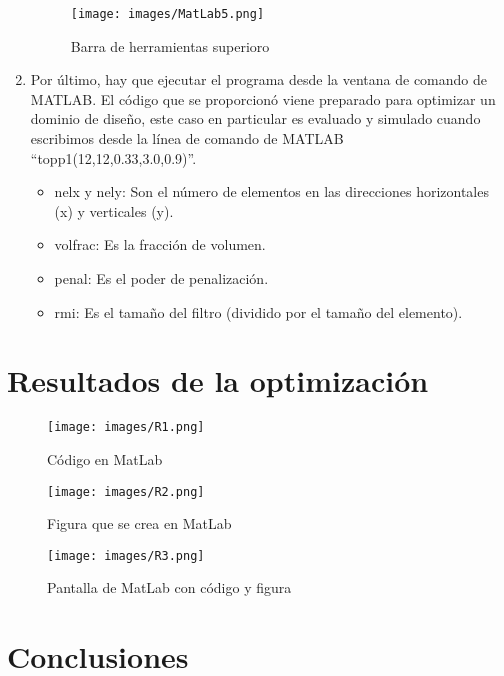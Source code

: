\documentclass{article}
\begin{document}
\begin{enumerate}
\begin{figure}[h] %
    \centering
    \texttt{[image: images/MatLab5.png]} %
    \caption{Barra de herramientas superioro}
\end{figure}

\item   Por último, hay que ejecutar el programa desde la ventana de comando de MATLAB. El código que se proporcionó viene preparado para optimizar un dominio de diseño, este caso en particular es evaluado y simulado cuando escribimos desde la línea de comando de MATLAB “topp1(12,12,0.33,3.0,0.9)”.
\begin{itemize}
  \item nelx y nely: Son el número de elementos en las direcciones horizontales (x) y verticales (y). 
   \item	volfrac: Es la fracción de volumen. 
   \item	penal: Es el poder de penalización. 
   \item	rmi: Es el tamaño del filtro (dividido por el tamaño del elemento).
\end{itemize}

\end{enumerate}

\newpage

\section{Resultados de la optimización}

\begin{figure}[h] %
    \centering
    \texttt{[image: images/R1.png]} %
    \caption{C\'{o}digo en MatLab}
\end{figure}



\begin{figure}[h] %
    \centering
    \texttt{[image: images/R2.png]} %
    \caption{Figura que se crea en MatLab}
\end{figure}


\begin{figure}[h] %
    \centering
    \texttt{[image: images/R3.png]} %
    \caption{Pantalla de MatLab con c\'{o}digo y figura}
\end{figure}

\newpage
\newpage

\section{Conclusiones}
\end{document}
